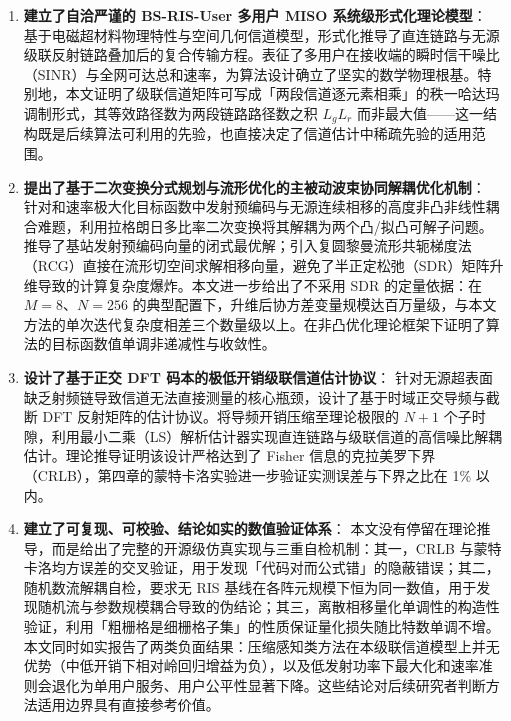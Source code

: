 \begin{enumerate}
  \item \textbf{建立了自洽严谨的 BS-RIS-User 多用户 MISO 系统级形式化理论模型}：
  基于电磁超材料物理特性与空间几何信道模型，形式化推导了直连链路与无源级联反射链路叠加后的复合传输方程。表征了多用户在接收端的瞬时信干噪比（SINR）与全网可达总和速率，为算法设计确立了坚实的数学物理根基。特别地，本文证明了级联信道矩阵可写成「两段信道逐元素相乘」的秩一哈达玛调制形式，其等效路径数为两段链路路径数之积 $L_g L_r$ 而非最大值——这一结构既是后续算法可利用的先验，也直接决定了信道估计中稀疏先验的适用范围。

  \item \textbf{提出了基于二次变换分式规划与流形优化的主被动波束协同解耦优化机制}：
  针对和速率极大化目标函数中发射预编码与无源连续相移的高度非凸非线性耦合难题，利用拉格朗日多比率二次变换将其解耦为两个凸/拟凸可解子问题。推导了基站发射预编码向量的闭式最优解；引入复圆黎曼流形共轭梯度法（RCG）直接在流形切空间求解相移向量，避免了半正定松弛（SDR）矩阵升维导致的计算复杂度爆炸。本文进一步给出了不采用 SDR 的定量依据：在 $M = 8$、$N = 256$ 的典型配置下，升维后协方差变量规模达百万量级，与本文方法的单次迭代复杂度相差三个数量级以上。在非凸优化理论框架下证明了算法的目标函数值单调非递减性与收敛性。

  \item \textbf{设计了基于正交 DFT 码本的极低开销级联信道估计协议}：
  针对无源超表面缺乏射频链导致信道无法直接测量的核心瓶颈，设计了基于时域正交导频与截断 DFT 反射矩阵的估计协议。将导频开销压缩至理论极限的 $N+1$ 个子时隙，利用最小二乘（LS）解析估计器实现直连链路与级联信道的高信噪比解耦估计。理论推导证明该设计严格达到了 Fisher 信息的克拉美罗下界（CRLB），第四章的蒙特卡洛实验进一步验证实测误差与下界之比在 1\% 以内。

  \item \textbf{建立了可复现、可校验、结论如实的数值验证体系}：
  本文没有停留在理论推导，而是给出了完整的开源级仿真实现与三重自检机制：其一，CRLB 与蒙特卡洛均方误差的交叉验证，用于发现「代码对而公式错」的隐蔽错误；其二，随机数流解耦自检，要求无 RIS 基线在各阵元规模下恒为同一数值，用于发现随机流与参数规模耦合导致的伪结论；其三，离散相移量化单调性的构造性验证，利用「粗栅格是细栅格子集」的性质保证量化损失随比特数单调不增。本文同时如实报告了两类负面结果：压缩感知类方法在本级联信道模型上并无优势（中低开销下相对岭回归增益为负），以及低发射功率下最大化和速率准则会退化为单用户服务、用户公平性显著下降。这些结论对后续研究者判断方法适用边界具有直接参考价值。
\end{enumerate}

